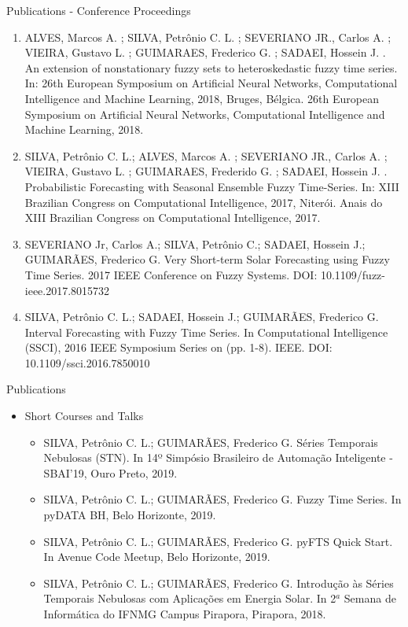 \documentclass{beamer}
\begin{document}
\begin{frame}{Publications - Conference Proceedings}
\scriptsize
\begin{enumerate}
\item ALVES, Marcos A. ; SILVA, Petrônio C. L. ; SEVERIANO JR., Carlos A. ; VIEIRA, Gustavo L. ; GUIMARAES, Frederico G. ; SADAEI, Hossein J. . An extension of nonstationary fuzzy sets to heteroskedastic fuzzy time series. In: 26th European Symposium on Artificial Neural Networks, Computational Intelligence and Machine Learning, 2018, Bruges, Bélgica. 26th European Symposium on Artificial Neural Networks, Computational Intelligence and Machine Learning, 2018.
\item SILVA, Petrônio C. L.; ALVES, Marcos A. ; SEVERIANO JR., Carlos A. ; VIEIRA, Gustavo L. ; GUIMARAES, Frederido G. ; SADAEI, Hossein J. . Probabilistic Forecasting with Seasonal Ensemble Fuzzy Time-Series. In: XIII Brazilian Congress on Computational Intelligence, 2017, Niterói. Anais do XIII Brazilian Congress on Computational Intelligence, 2017.
\item SEVERIANO Jr, Carlos A.; SILVA, Petrônio C.; SADAEI, Hossein J.; GUIMARÃES, Frederico G. Very Short-term Solar Forecasting using Fuzzy Time Series. 2017 IEEE Conference on Fuzzy Systems. DOI: 10.1109/fuzz-ieee.2017.8015732
\item SILVA, Petrônio C. L.; SADAEI, Hossein J.; GUIMARÃES, Frederico G. Interval Forecasting with Fuzzy Time Series. In Computational Intelligence (SSCI), 2016 IEEE Symposium Series on (pp. 1-8). IEEE. DOI: 10.1109/ssci.2016.7850010
\end{enumerate}
\end{frame}

\begin{frame}{Publications}
\begin{itemize}
    \item Short Courses and Talks
    \begin{itemize}
    \item SILVA, Petrônio C. L.; GUIMARÃES, Frederico G. Séries Temporais Nebulosas (STN). In 14º Simpósio Brasileiro de Automação Inteligente - SBAI'19, Ouro Preto, 2019.
    \item SILVA, Petrônio C. L.; GUIMARÃES, Frederico G. Fuzzy Time Series. In pyDATA BH, Belo Horizonte, 2019.
    \item SILVA, Petrônio C. L.; GUIMARÃES, Frederico G. pyFTS Quick Start. In Avenue Code Meetup, Belo Horizonte, 2019.
    \item SILVA, Petrônio C. L.; GUIMARÃES, Frederico G. Introdução às Séries Temporais Nebulosas com Aplicações em Energia Solar. In 2$^a$ Semana de Informática do IFNMG Campus Pirapora, Pirapora, 2018.
\end{itemize}
\end{itemize}
\end{frame}
\end{document}
